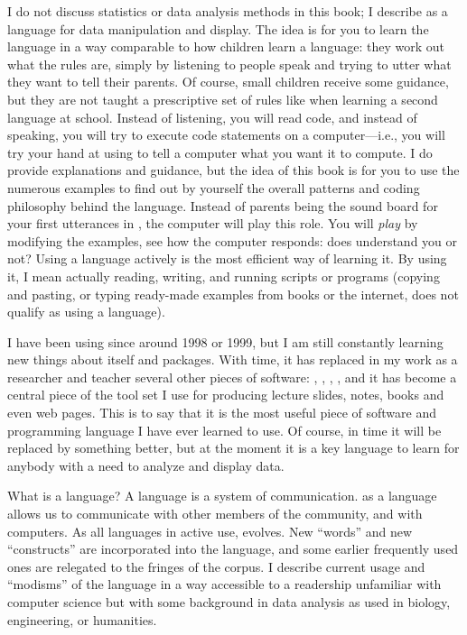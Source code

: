 I do not discuss statistics or data analysis methods in this book; I describe \Rlang as a language for data manipulation and display. The idea is for you to learn the \Rlang language in a way comparable to how children learn a language: they work out what the rules are, simply by listening to people speak and trying to utter what they want to tell their parents. Of course, small children receive some guidance, but they are not taught a prescriptive set of rules like when learning a second language at school. Instead of listening, you will read code, and instead of speaking, you will try to execute \Rlang  code statements on a computer---i.e., you will try your hand at using \Rlang to tell a computer what you want it to compute. I do provide explanations and guidance, but the idea of this book is for you to use the numerous examples to find out by yourself the overall patterns and coding philosophy behind the \Rlang language. Instead of parents being the sound board for your first utterances in \Rlang, the computer will play this role. You will \emph{play} by modifying the examples, see how the computer responds: does \Rlang understand you or not? Using a language actively is the most efficient way of learning it. By using it, I mean actually reading, writing, and running scripts or programs (copying and pasting, or typing ready-made examples from books or the internet, does not qualify as using a language).

I have been using \Rlang since around 1998 or 1999, but I am still constantly learning new things about \Rlang itself and \Rlang packages. With time, it has replaced in my work as a researcher and teacher several other pieces of software: , , , , and it has become a central piece of the tool set I use for producing lecture slides, notes, books and even web pages. This is to say that it is the most useful piece of software and programming language I have ever learned to use. Of course, in time it will be replaced by something better, but at the moment it is a key language to learn for anybody with a need to analyze and display data.

What is a language? A language is a system of communication. \Rlang as a language allows us to communicate with other members of the \Rlang community, and with computers. As all languages in active use, \Rlang evolves. New ``words'' and new ``constructs'' are incorporated into the language, and some earlier frequently used ones are relegated to the fringes of the corpus. I describe current usage and ``modisms'' of the \Rlang language in a way accessible to a readership unfamiliar with computer science but with some background in data analysis as used in biology, engineering, or humanities.

